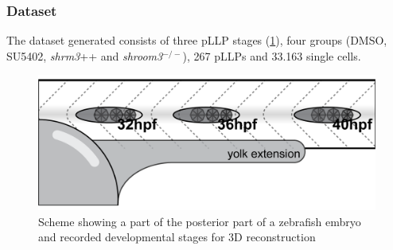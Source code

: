\documentclass[11pt,singlespacinge,twoside]{reedthesis} %
\theoremstyle{definition}
\theoremstyle{definition}
\theoremstyle{definition}
\theoremstyle{remark}
\begin{document}
\hypertarget{dataset-1}{%
\subsubsection{Dataset}\label{dataset-1}}

The dataset generated consists of three pLLP stages (\ref{fig:acstages}), four groups (DMSO, SU5402, \emph{shrm3}++ and \emph{shroom3}\(^{-/-}\)), 267 pLLPs and 33.163 single cells.\newline


\begin{figure}[H]

{\centering \includegraphics[width=0.6\linewidth]{figures/results/04_constriction/Yolk_ext} 

}

\caption[Recorded developmental stages for 3D reconstruction]{Scheme showing a part of the posterior part of a zebrafish embryo and recorded developmental stages for 3D reconstruction}\label{fig:acstages}
\end{figure}
\end{document}
